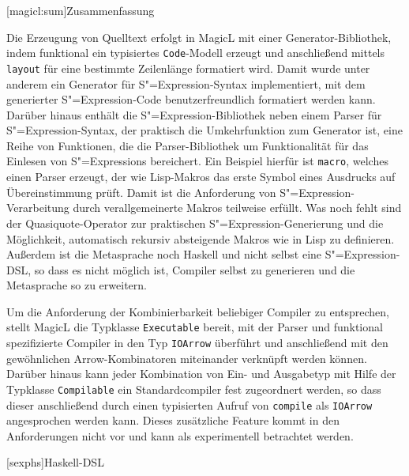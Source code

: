 \documentclass[12pt, a4paper, bibgerm]{scrbook}
\newcommand\icode[1]{\lstinline?#1?}
\newcommand\lchapter{}
\newcommand\lsection{}
\newcommand{\sexp}{S"=Expression}
\newcommand{\sexps}{S"=Expressions}
\begin{document}
\lsection[magicl:sum]{Zusammenfassung}

Die Erzeugung von Quelltext erfolgt in MagicL mit einer
Generator-Bibliothek, indem funktional ein typisiertes
\icode{Code}-Modell erzeugt und anschließend mittels \icode{layout} für
eine bestimmte Zeilenlänge formatiert wird. Damit wurde unter anderem
ein Generator für \sexp{}-Syntax implementiert, mit dem generierter
\sexp{}-Code benutzerfreundlich formatiert werden kann. Darüber hinaus
enthält die \sexp{}-Bibliothek neben einem Parser für \sexp{}-Syntax,
der praktisch die Umkehrfunktion zum Generator ist, eine Reihe von
Funktionen, die die Parser-Bibliothek um Funktionalität für das Einlesen
von \sexps{} bereichert. Ein Beispiel hierfür ist \icode{macro}, welches
einen Parser erzeugt, der wie Lisp-Makros das erste Symbol eines
Ausdrucks auf Übereinstimmung prüft. Damit ist die Anforderung von
\sexp{}-Verarbeitung durch verallgemeinerte Makros teilweise erfüllt.
Was noch fehlt sind der Quasiquote-Operator zur praktischen
\sexp{}-Generierung und die Möglichkeit, automatisch rekursiv
absteigende Makros wie in Lisp zu definieren. Außerdem ist die
Metasprache noch Haskell und nicht selbst eine \sexp{}-DSL, so dass es
nicht möglich ist, Compiler selbst zu generieren und die Metasprache so
zu erweitern.

Um die Anforderung der Kombinierbarkeit beliebiger Compiler zu
entsprechen, stellt MagicL die Typklasse \icode{Executable} bereit, mit
der Parser und funktional spezifizierte Compiler in den Typ
\icode{IOArrow} überführt und anschließend mit den gewöhnlichen
Arrow-Kombinatoren miteinander verknüpft werden können. Darüber hinaus
kann jeder Kombination von Ein- und Ausgabetyp mit Hilfe der Typklasse
\icode{Compilable} ein Standardcompiler fest zugeordnert werden, so dass
dieser anschließend durch einen typisierten Aufruf von \icode{compile}
als \icode{IOArrow} angesprochen werden kann. Dieses zusätzliche Feature kommt
in den Anforderungen nicht vor und kann als experimentell betrachtet
werden.

\lchapter[sexphs]{Haskell-DSL}
\end{document}
